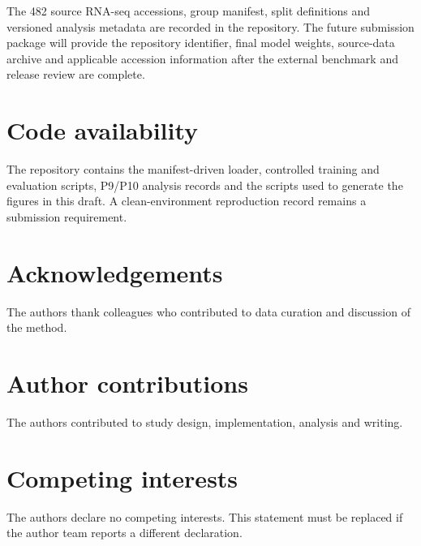 \documentclass[pdflatex,sn-nature]{sn-jnl}
\begin{document}
The 482 source RNA-seq accessions, group manifest, split definitions and versioned analysis metadata are recorded in the repository. The future submission package will provide the repository identifier, final model weights, source-data archive and applicable accession information after the external benchmark and release review are complete.

\section*{Code availability}

The repository contains the manifest-driven loader, controlled training and evaluation scripts, P9/P10 analysis records and the scripts used to generate the figures in this draft. A clean-environment reproduction record remains a submission requirement.

\section*{Acknowledgements}

The authors thank colleagues who contributed to data curation and discussion of the method.

\section*{Author contributions}

The authors contributed to study design, implementation, analysis and writing.

\section*{Competing interests}

The authors declare no competing interests. This statement must be replaced if the author team reports a different declaration.
\end{document}
